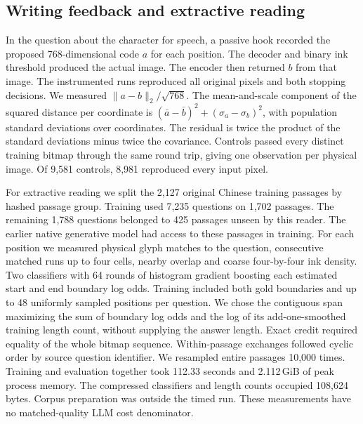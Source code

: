 \subsection*{Writing feedback and extractive reading}
In the question about the character for speech, a passive hook recorded
the proposed 768-dimensional code $a$ for each position. The decoder and
binary ink threshold produced the actual image. The encoder then returned
$b$ from that image. The instrumented runs reproduced all original pixels
and both stopping decisions. We measured $\|a-b\|_2/\sqrt{768}$. The
mean-and-scale component of the squared distance per coordinate is
$(\bar a-\bar b)^2+(\sigma_a-\sigma_b)^2$, with population standard deviations
over coordinates. The residual is twice the product of the standard
deviations minus twice the covariance. Controls passed every distinct
training bitmap through the same round trip, giving one observation per
physical image. Of 9,581 controls, 8,981 reproduced every input pixel.

For extractive reading we split the 2,127 original Chinese training passages
by hashed passage group. Training used 7,235 questions on 1,702 passages.
The remaining 1,788 questions belonged to 425 passages unseen by this reader.
The earlier native generative model had access to these passages in training.
For each position we measured physical glyph matches to the question,
consecutive matched runs up to four cells, nearby overlap and coarse
four-by-four ink density. Two classifiers with 64 rounds of histogram gradient
boosting each estimated start and end boundary log odds. Training included
both gold boundaries and up to 48 uniformly sampled positions per question.
We chose the contiguous span maximizing the sum of boundary log odds and
the log of its add-one-smoothed training length count, without supplying the
answer length. Exact credit required equality of the whole bitmap sequence.
Within-passage exchanges followed cyclic order by source question identifier.
We resampled entire passages 10,000 times. Training and evaluation together
took 112.33 seconds and 2.112\,GiB of peak process memory. The compressed
classifiers and length counts occupied 108,624 bytes. Corpus preparation was
outside the timed run. These measurements have no matched-quality LLM cost
denominator.
